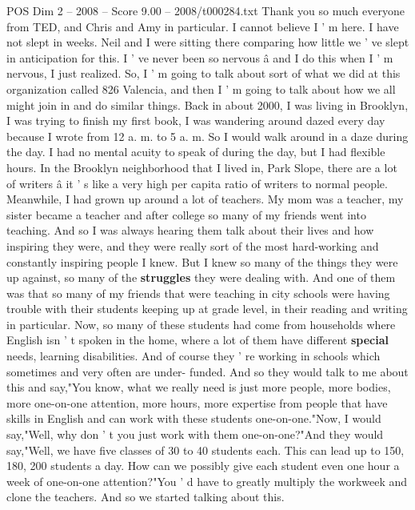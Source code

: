 \begin{textsample}{POS Dim 2 – 2008 – Score 9.00 – 2008/t000284.txt}  \label{ex:f2_pos_075}
Thank you so much everyone from TED, and Chris and Amy in particular.
I cannot believe I ' m here.
I have not slept in weeks.
Neil and I were sitting there comparing how little we ' ve slept in anticipation for this.
I ' ve never been so nervous â and I do this when I ' m nervous, I just realized.
So, I ' m going to talk about sort of what we did at this organization called 826 Valencia, and then I ' m going to talk about how we all might join in and do similar things.
Back in about 2000, I was living in Brooklyn, I was trying to finish my first book, I was wandering around dazed every day because I wrote from 12 a. m. to 5 a. m.
So I would walk around in a daze during the day.
I had no mental acuity to speak of during the day, but I had flexible hours.
In the Brooklyn neighborhood that I lived in, Park Slope, there are a lot of writers â it ' s like a very high per capita ratio of writers to normal people.
Meanwhile, I had grown up around a lot of teachers.
My mom was a teacher, my sister became a teacher and after college so many of my friends went into teaching.
And so I was always hearing them talk about their lives and how inspiring they were, and they were really sort of the most hard-working and constantly inspiring people I knew.
But I knew so many of the things they were up against, so many of the \textbf{struggles} they were dealing with.
And one of them was that so many of my friends that were teaching in city schools were having trouble with their students keeping up at grade level, in their reading and writing in particular.
Now, so many of these students had come from households where English isn ' t spoken in the home, where a lot of them have different \textbf{special} needs, learning disabilities.
And of course they ' re working in schools which sometimes and very often are under- funded.
And so they would talk to me about this and say,"You know, what we really need is just more people, more bodies, more one-on-one attention, more hours, more expertise from people that have skills in English and can work with these students one-on-one."Now, I would say,"Well, why don ' t you just work with them one-on-one?"And they would say,"Well, we have five classes of 30 to 40 students each.
This can lead up to 150, 180, 200 students a day.
How can we possibly give each student even one hour a week of one-on-one attention?"You ' d have to greatly multiply the workweek and clone the teachers.
And so we started talking about this.

\end{textsample}
